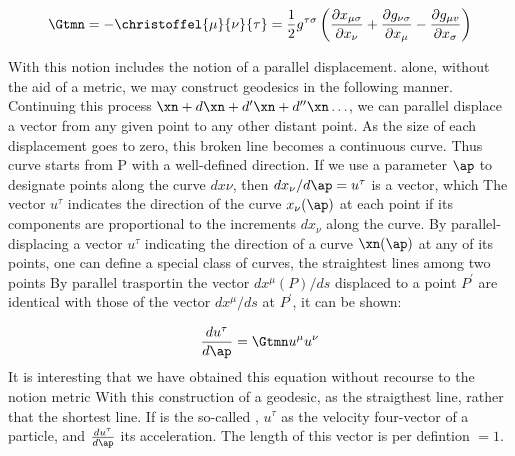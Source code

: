 {\begin{equation*}\label{eq:levicivita}
\Gtmn=-\christoffel{\mu}{\nu}{\tau} = \frac{1}{2} g^{\tau \sigma}\left(\frac{\partial x_{\mu \sigma}}{\partial x_{\nu}}+\frac{\partial g_{\nu \sigma}}{\partial x_{\mu}}-\frac{\partial g_{\mu v}}{\partial x_{\sigma}}\right)
\end{equation*}

With this notion includes the notion of a parallel displacement. alone, without the aid of a metric, we may construct geodesics in the following manner. Continuing this process $\xn+d\xn+d^{\prime} \xn+d^{\prime \prime} \xn \ldots$, we can parallel displace a vector from any given point to any other distant point. As the size of each displacement goes to zero, this broken line becomes a continuous curve. Thus curve starts from P with a well-defined direction. If we use a parameter $\ap$ to designate points along the curve $dx\nu$, then $dx_\nu/d\ap=u^\tau$ is a vector, which The vector $u^\tau$ indicates the direction of the curve $x_\nu(\ap)$ at each point if its components are proportional to the increments $dx_\nu$ along the curve. By parallel-displacing a vector $u^\tau$ indicating the direction of a curve $\xn(\ap)$ at any of its points, one can define a special class of curves, the straightest lines among two points By parallel trasportin the vector $d x^{\mu}(P) / d s$ displaced to a point $P^{\prime}$ are identical with those of the vector $d x^{\mu} / d s$ at $P^{\prime}$, it can be shown:


 
\begin{equation*}\label{eq:geodesicequation}
\frac{d {u^\tau}}{d\ap} = \Gtmn u^{\mu} u^\nu
\end{equation*}
%
It is interesting that we have obtained this equation without recourse to the notion metric With this construction of a geodesic, as the straigthest line, rather that the shortest line. If \ap is the so-called , $u^\tau$ as the velocity four-vector of a particle, and $\frac{d {u^\tau}}{d\ap}$ its acceleration. The length of this vector is per defintion $=1$. 

}
